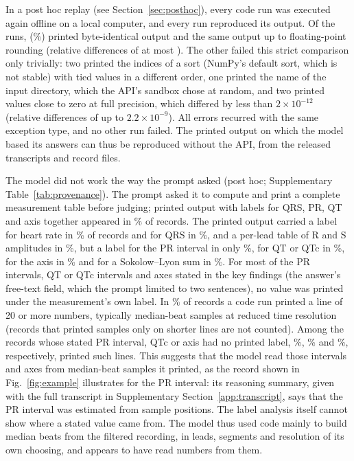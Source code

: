 In a post hoc replay (see Section~\ref{sec:posthoc}), every code run was executed again offline on a local computer, and every run
reproduced its output. Of the \RPRuns{} runs, \RPIdentical{} (\RPIdenticalPct\%) printed byte-identical output and
\RPRounding{} the same output up to floating-point rounding (relative differences of at most \RPMaxRel). The other
\RPDifferent{} failed this strict comparison only trivially: two printed the indices of a sort (NumPy's default sort,
which is not stable) with tied values in a different order, one printed the name of the input directory, which the
API's sandbox chose at random, and two printed values close to zero at full precision, which differed by less than
$2\times10^{-12}$ (relative differences of up to $2.2\times10^{-9}$). All \RPErrorsReproduced{} errors recurred with the same exception type, and no other run failed. The printed
output on which the model based its answers can thus be reproduced without the API, from the released transcripts and
record files.

The model did not work the way the prompt asked (post hoc; Supplementary Table~\ref{tab:provenance}). The prompt
asked it to compute and print a complete measurement table before judging; printed output with labels for QRS, PR, QT
and axis together appeared in \PHFullTablePct\% of records. The printed output carried a label for heart rate in
\PHPrintedHrPct\% of records and for QRS in \PHPrintedQrsPct\%, and a per-lead table of R and S amplitudes in
\PHLeadAmplitudePct\%, but a label for the PR interval in only \PHPrintedPrPct\%, for QT or QTc in \PHPrintedQtcPct\%,
for the axis in \PHPrintedAxisPct\% and for a Sokolow--Lyon sum in \PHPrintedSokolowPct\%. For most of the PR
intervals, QT or QTc intervals and axes stated in the key findings (the answer's free-text field, which the prompt
limited to two sentences), no value was printed under the measurement's own label. In \PHDumpPct\% of records a code run
printed a line of 20 or more numbers, typically median-beat samples at reduced time resolution (records that printed
samples only on shorter lines are not counted). Among the records whose stated PR interval, QTc or axis had no
printed label, \PHDumpUnlabelledPrPct\%, \PHDumpUnlabelledQtcPct\% and \PHDumpUnlabelledAxisPct\%, respectively,
printed such lines. This suggests that the model read those intervals and axes from median-beat samples it printed,
as the record shown in Fig.~\ref{fig:example} illustrates for the PR interval: its reasoning summary, given with the
full transcript in Supplementary Section~\ref{app:transcript}, says that the PR interval was estimated from sample
positions. The label analysis itself cannot show where a stated value came from. The model thus used code mainly to build median beats from the filtered
recording, in leads, segments and resolution of its own choosing, and appears to have read numbers from them.

